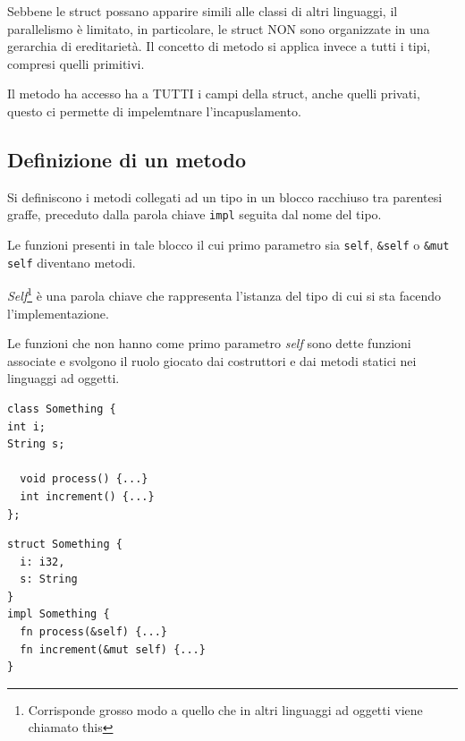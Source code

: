 

Sebbene le struct possano apparire simili alle classi di altri linguaggi,
il parallelismo è limitato, in particolare, le struct NON sono organizzate in una gerarchia di
ereditarietà. Il concetto di metodo si applica invece a tutti i tipi, compresi quelli primitivi.


Il metodo ha accesso ha a TUTTI i campi della struct, anche quelli privati, questo
ci permette di impelemtnare l'incapuslamento.

\subsection{Definizione di un metodo}
Si definiscono i metodi collegati ad un tipo in un blocco racchiuso tra parentesi
graffe, preceduto dalla parola chiave \texttt{impl} seguita dal nome del tipo.


Le funzioni presenti in tale blocco il cui primo parametro sia \texttt{self},
\texttt{&self} o  \texttt{&mut self} diventano metodi.

\textit{Self}\footnote{Corrisponde grosso modo a quello che in altri linguaggi ad oggetti
  viene chiamato this} è una parola chiave che rappresenta l'istanza del tipo di cui si
sta facendo l'implementazione.


Le funzioni che non hanno come primo parametro \textit{self} sono dette funzioni
associate e svolgono il ruolo giocato dai costruttori e dai metodi statici nei
linguaggi ad oggetti.



\begin{center}
  \centering
  \begin{minipage}{\linewidth}
    \begin{minipage}{0.47\linewidth}
      \begin{verbatim}
class Something {
int i;
String s;

  void process() {...}
  int increment() {...}
};
\end{verbatim}

    \end{minipage}%
    \hfill
    \begin{minipage}{\linewidth}
      \begin{minipage}{0.47\linewidth}
        \begin{verbatim}
struct Something {
  i: i32,
  s: String
}
impl Something {
  fn process(&self) {...}
  fn increment(&mut self) {...}
}

\end{verbatim}
      \end{minipage}
    \end{minipage}
  \end{minipage}
\end{center}

